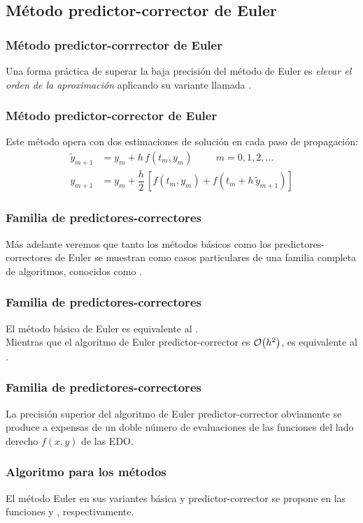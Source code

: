 \subsection{Método predictor-corrector de Euler}
\begin{frame}
\frametitle{Método predictor-corrrector de Euler}
Una forma práctica de superar la baja precisión del método de Euler es \emph{elevar el orden de la aproximación} aplicando su variante llamada .\end{frame}
\begin{frame}
\frametitle{Método predictor-corrector de Euler}
Este método opera con dos estimaciones de solución en cada paso de propagación:
\begin{align}
\tilde{y}_{m+1} &= y_{m} + h \, f(t_{m}, y_{m}) \hspace{1cm} m = 0, 1, 2, \ldots \label{eq:ecuacion_12_17} \\
y_{m+1} &= y_{m} + \dfrac{h}{2} \, \left[ f(t_{m}, y_{m}) + f(t_{m} + h \, \tilde{y}_{m+1}) \right] \label{eq:ecuacion_12_18}
\end{align}
\end{frame}
\begin{frame}
\frametitle{Familia de predictores-correctores}
Más adelante veremos que tanto los métodos básicos como los predictores-correctores de Euler se muestran como casos particulares de una familia completa de algoritmos, conocidos como .
\end{frame}
\begin{frame}
\frametitle{Familia de predictores-correctores}
El método básico de Euler es equivalente al .
\\
\bigskip
Mientras que el algoritmo de Euler predictor-corrector es $\order{h^{2}}$, es equivalente al .
\end{frame}
\begin{frame}
\frametitle{Familia de predictores-correctores}
La precisión superior del algoritmo de Euler predictor-corrector obviamente se produce a expensas de un doble número de evaluaciones de las funciones del lado derecho $f(x, y)$ de las EDO.
\end{frame}
\begin{frame}
\frametitle{Algoritmo para los métodos}
El método Euler en sus variantes básica y predictor-corrector se propone en las funciones  y , respectivamente.
\end{frame}
